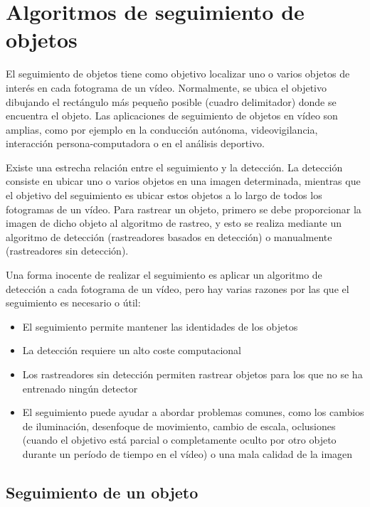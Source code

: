 \section{Algoritmos de seguimiento de objetos}
\label{sec:tecnicas-utilizadas-tracking}

El seguimiento de objetos tiene como objetivo localizar uno o varios objetos de interés en cada fotograma de un vídeo. Normalmente, se ubica el objetivo dibujando el rectángulo más pequeño posible (cuadro delimitador) donde se encuentra el objeto. Las aplicaciones de seguimiento de objetos en vídeo son amplias, como por ejemplo en la conducción autónoma, videovigilancia, interacción persona-computadora o en el análisis deportivo.

Existe una estrecha relación entre el seguimiento y la detección. La detección consiste en ubicar uno o varios objetos en una imagen determinada, mientras que el objetivo del seguimiento es ubicar estos objetos a lo largo de todos los fotogramas de un vídeo. Para rastrear un objeto, primero se debe proporcionar la imagen de dicho objeto al algoritmo de rastreo, y esto se realiza mediante un algoritmo de detección (rastreadores basados en detección) o manualmente (rastreadores sin detección).

Una forma inocente de realizar el seguimiento es aplicar un algoritmo de detección a cada fotograma de un vídeo, pero hay varias razones por las que el seguimiento es necesario o útil:
\begin{itemize}
    \item El seguimiento permite mantener las identidades de los objetos
    \item La detección requiere un alto coste computacional
    \item Los rastreadores sin detección permiten rastrear objetos para los que no se ha entrenado ningún detector
    \item El seguimiento puede ayudar a abordar problemas comunes, como los  cambios de iluminación, desenfoque de movimiento, cambio de escala, oclusiones (cuando el objetivo está parcial o completamente oculto por otro objeto durante un período de tiempo en el vídeo) o una mala calidad de la imagen
\end{itemize}

\subsection{Seguimiento de un objeto}
\label{subsec:seguimiento-un-objeto}

